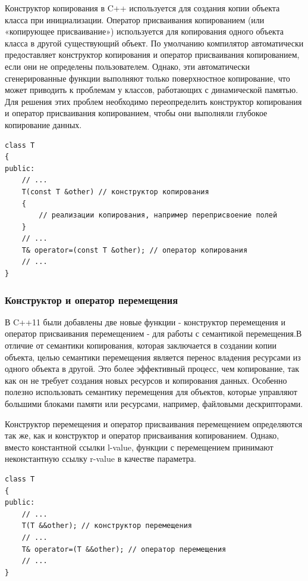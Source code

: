 Конструктор копирования в C++ используется для создания копии объекта класса при инициализации. Оператор присваивания копированием (или «копирующее присваивание») используется для копирования одного объекта класса в другой существующий объект. По умолчанию компилятор автоматически предоставляет конструктор копирования и оператор присваивания копированием, если они не определены пользователем. Однако, эти автоматически сгенерированные функции выполняют только поверхностное копирование, что может приводить к проблемам у классов, работающих с динамической памятью. Для решения этих проблем необходимо переопределить конструктор копирования и оператор присваивания копированием, чтобы они выполняли глубокое копирование данных.

\begin{verbatim}
class T 
{
public:
    // ...
    T(const T &other) // конструктор копирования
    {
        // реализации копирования, например переприсвоение полей
    }
    // ...
    T& operator=(const T &other); // оператор копирования
    // ...
}
\end{verbatim}

\subsubsection{Конструктор и оператор перемещения}

В C++11 были добавлены две новые функции - конструктор перемещения и оператор присваивания перемещением - для работы с семантикой перемещения.В отличие от семантики копирования, которая заключается в создании копии объекта, целью семантики перемещения является перенос владения ресурсами из одного объекта в другой. Это более эффективный процесс, чем копирование, так как он не требует создания новых ресурсов и копирования данных. Особенно полезно использовать семантику перемещения для объектов, которые управляют большими блоками памяти или ресурсами, например, файловыми дескрипторами.

Конструктор перемещения и оператор присваивания перемещением определяются так же, как и конструктор и оператор присваивания копированием. Однако, вместо константной ссылки l-value, функции с перемещением принимают неконстантную ссылку r-value в качестве параметра.

\begin{verbatim}
class T 
{
public:
    // ...
    T(T &&other); // конструктор перемещения
    // ...
    T& operator=(T &&other); // оператор перемещения
    // ...
}
\end{verbatim}

